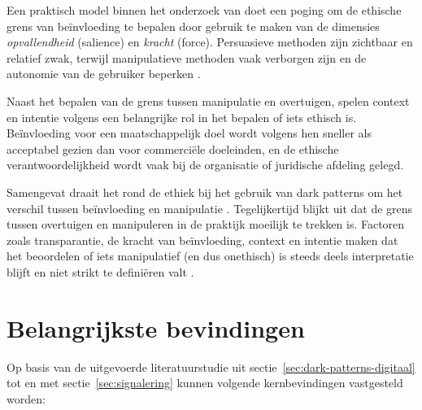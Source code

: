 \vspace{1em}

Een praktisch model binnen het onderzoek van \textcite{SanchezChamorro2023} doet een poging om de ethische grens van beïnvloeding te bepalen door gebruik te maken van de dimensies \emph{opvallendheid} (salience) en \emph{kracht} (force). Persuasieve methoden zijn zichtbaar en relatief zwak, terwijl manipulatieve methoden vaak verborgen zijn en de autonomie van de gebruiker beperken \autocite{SanchezChamorro2023}. 

\vspace{1em}

Naast het bepalen van de grens tussen manipulatie en overtuigen, spelen context en intentie volgens \textcite{SanchezChamorro2023} een belangrijke rol in het bepalen of iets ethisch is. Beïnvloeding voor een maatschappelijk doel wordt volgens hen sneller als acceptabel gezien dan voor commerciële doeleinden, en de ethische verantwoordelijkheid wordt vaak bij de organisatie of juridische afdeling gelegd.

\vspace{1em}

Samengevat draait het rond de ethiek bij het gebruik van dark patterns om het verschil tussen beïnvloeding en manipulatie \autocite{SanchezChamorro2023}. Tegelijkertijd blijkt uit \textcite{SanchezChamorro2023, Kitkowska2023, DiGeronimo2020} dat de grens tussen overtuigen en manipuleren in de praktijk moeilijk te trekken is. Factoren zoals transparantie, de kracht van beïnvloeding, context en intentie maken dat het beoordelen of iets manipulatief (en dus onethisch) is steeds deels interpretatie blijft en niet strikt te definiëren valt \autocite{SanchezChamorro2023}.

\newpage

\section{Belangrijkste bevindingen}
\label{sec:belangrijkste-bevindingen}

\vspace{1em}

Op basis van de uitgevoerde literatuurstudie uit sectie~\ref{sec:dark-patterns-digitaal} tot en met sectie~\ref{sec:signalering} kunnen volgende kernbevindingen vastgesteld worden:

